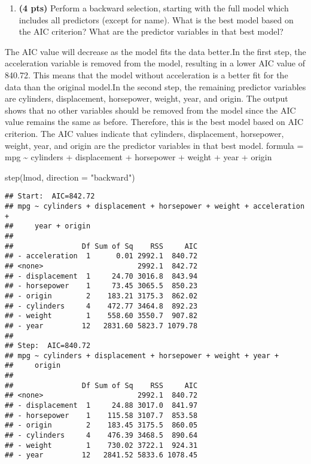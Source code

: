 \documentclass[
]{article}
\newenvironment{Shaded}{\begin{snugshade}}{\end{snugshade}}
\newcommand{\AttributeTok}[1]{\textcolor[rgb]{0.77,0.63,0.00}{#1}}
\newcommand{\FunctionTok}[1]{\textcolor[rgb]{0.00,0.00,0.00}{#1}}
\newcommand{\NormalTok}[1]{#1}
\newcommand{\StringTok}[1]{\textcolor[rgb]{0.31,0.60,0.02}{#1}}
\providecommand{\tightlist}{%
  \setlength{\itemsep}{0pt}\setlength{\parskip}{0pt}}
\begin{document}
\begin{enumerate}
\def\labelenumi{(\alph{enumi})}
\setcounter{enumi}{6}
\tightlist
\item
  \textbf{(4 pts)} Perform a backward selection, starting with the full
  model which includes all predictors (except for name). What is the
  best model based on the AIC criterion? What are the predictor
  variables in that best model?
\end{enumerate}

The AIC value will decrease as the model fits the data better.In the
first step, the acceleration variable is removed from the model,
resulting in a lower AIC value of 840.72. This means that the model
without acceleration is a better fit for the data than the original
model.In the second step, the remaining predictor variables are
cylinders, displacement, horsepower, weight, year, and origin. The
output shows that no other variables should be removed from the model
since the AIC value remains the same as before. Therefore, this is the
best model based on AIC criterion. The AIC values indicate that
cylinders, displacement, horsepower, weight, year, and origin are the
predictor variables in that best model. formula = mpg \textasciitilde{}
cylinders + displacement + horsepower + weight + year + origin

\begin{Shaded}
\begin{Highlighting}[]
\FunctionTok{step}\NormalTok{(lmod, }\AttributeTok{direction =} \StringTok{"backward"}\NormalTok{)}
\end{Highlighting}
\end{Shaded}

\begin{verbatim}
## Start:  AIC=842.72
## mpg ~ cylinders + displacement + horsepower + weight + acceleration + 
##     year + origin
## 
##                Df Sum of Sq    RSS     AIC
## - acceleration  1      0.01 2992.1  840.72
## <none>                      2992.1  842.72
## - displacement  1     24.70 3016.8  843.94
## - horsepower    1     73.45 3065.5  850.23
## - origin        2    183.21 3175.3  862.02
## - cylinders     4    472.77 3464.8  892.23
## - weight        1    558.60 3550.7  907.82
## - year         12   2831.60 5823.7 1079.78
## 
## Step:  AIC=840.72
## mpg ~ cylinders + displacement + horsepower + weight + year + 
##     origin
## 
##                Df Sum of Sq    RSS     AIC
## <none>                      2992.1  840.72
## - displacement  1     24.88 3017.0  841.97
## - horsepower    1    115.58 3107.7  853.58
## - origin        2    183.45 3175.5  860.05
## - cylinders     4    476.39 3468.5  890.64
## - weight        1    730.02 3722.1  924.31
## - year         12   2841.52 5833.6 1078.45
\end{verbatim}
\end{document}
